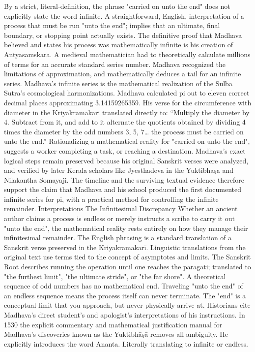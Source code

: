 {By a strict, literal-definition, the phrase "carried on unto the end" does not explicitly state the word infinite. A straightforward, English, interpretation of a process that must be run "unto the end"; implies that an ultimate, final boundary, or stopping point actually exists. The definitive proof that Madhava believed and states his process was mathematically infinite is his creation of Antyasamskara. A medieval mathematician had to theoretically calculate millions of terms for an accurate standard series number. Madhava recognized the limitations of approximation, and mathematically deduces a tail for an infinite series. Madhava’s infinite series is the mathematical realization of the Sulba Sutra’s cosmological harmonizations. Madhava calculated pi out to eleven correct decimal places approximating 3.14159265359. His verse for the circumference with diameter in the Kriyakramakari translated directly to:
“Multiply the diameter by 4. Subtract from it, and add to it alternate the quotients obtained by dividing 4 times the diameter by the odd numbers 3, 5, 7… the process must be carried on unto the end.”
Rationalizing a mathematical reality for "carried on unto the end", suggests a worker completing a task, or reaching a destination. Madhava’s exact logical steps remain preserved because his original Sanskrit verses were analyzed, and verified by later Kerala scholars like Jyesthadeva in the Yuktibhaṣa and Nilakantha Somayaji. The timeline and the surviving textual evidence therefore support the claim that Madhava and his school produced the first documented infinite series for pi, with a practical method for controlling the infinite remainder.  
Interpretations
The Infinitesimal Discrepancy
Whether an ancient author claims a process is endless or merely instructs a scribe to carry it out "unto the end", the mathematical reality rests entirely on how they manage their infinitesimal remainder. The English phrasing is a standard translation of a Sanskrit verse preserved in the Kriyakramakarī. Linguistic translations from the original text use terms tied to the concept of asymptotes and limits. The Sanskrit Root describes running the operation until one reaches the paragati; translated to "the furthest limit", "the ultimate stride", or "the far shore". A theoretical sequence of odd numbers has no mathematical end. Traveling "unto the end" of an endless sequence means the process itself can never terminate. The "end" is a conceptual limit that you approach, but never physically arrive at. Historians cite Madhava's direct student’s and apologist’s interpretations of his instructions. In 1530 the explicit commentary and mathematical justification manual for Madhava's discoveries known as the Yuktibhāṣā removes all ambiguity. He explicitly introduces the word Ananta. Literally translating to infinite or endless. 
}
